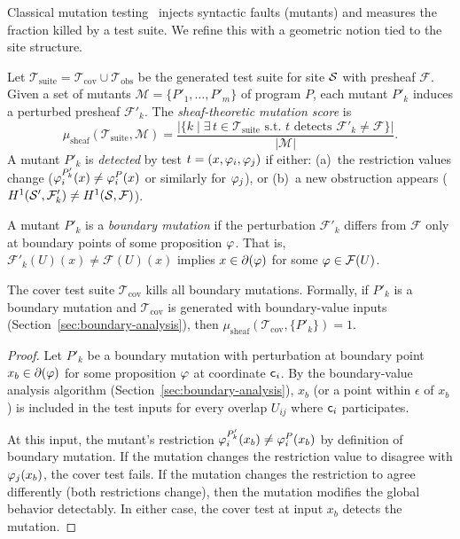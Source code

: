 \documentclass[11pt]{article}
\newcommand{\TestSuite}{\mathcal{T}_{\mathrm{suite}}}
\newcommand{\CoverSuite}{\mathcal{T}_{\mathrm{cov}}}
\newcommand{\ObstrSuite}{\mathcal{T}_{\mathrm{obs}}}
\begin{document}
Classical mutation testing~\cite{Jia2011} injects syntactic faults
(mutants) and measures the fraction killed by a test suite.  We refine
this with a geometric notion tied to the site structure.

\begin{definition}\label{def:sheaf-mutation}
Let $\TestSuite = \CoverSuite \cup \ObstrSuite$ be the generated test
suite for site $\mathcal{S}$ with presheaf $\mathcal{F}$.  Given a set of
mutants $\mathcal{M} = \{P'_1, \ldots, P'_m\}$ of program $P$, each
mutant $P'_k$ induces a perturbed presheaf $\mathcal{F}'_k$.  The
\emph{sheaf-theoretic mutation score} is
\[
  \mu_{\mathrm{sheaf}}(\TestSuite, \mathcal{M}) =
  \frac{|\{k \mid \exists\, t \in \TestSuite \text{ s.t.\ } t
  \text{ detects } \mathcal{F}'_k \neq \mathcal{F}\}|}{|\mathcal{M}|}.
\]
A mutant $P'_k$ is \emph{detected} by test $t = (x, \varphi_i, \varphi_j)$
if either: (a)~the restriction values change
($\varphi_i^{P'_k}(x) \neq \varphi_i^P(x)$ or similarly for $\varphi_j$),
or (b)~a new obstruction appears
($H^{1}(\mathcal{S}', \mathcal{F}'_k) \neq H^{1}(\mathcal{S}, \mathcal{F})$).
\end{definition}

\begin{definition}\label{def:boundary-mutation}
A mutant $P'_k$ is a \emph{boundary mutation} if the perturbation
$\mathcal{F}'_k$ differs from $\mathcal{F}$ only at boundary points
of some proposition $\varphi$.  That is, $\mathcal{F}'_k(U)(x) \neq
\mathcal{F}(U)(x)$ implies $x \in \partial(\varphi)$ for some
$\varphi \in \mathcal{F}(U)$.
\end{definition}

\begin{theorem}\label{thm:mutation-complete}
The cover test suite $\CoverSuite$ kills all boundary mutations.
Formally, if $P'_k$ is a boundary mutation and $\CoverSuite$ is
generated with boundary-value inputs (Section~\ref{sec:boundary-analysis}),
then $\mu_{\mathrm{sheaf}}(\CoverSuite, \{P'_k\}) = 1$.
\end{theorem}

\begin{proof}
Let $P'_k$ be a boundary mutation with perturbation at boundary point
$x_b \in \partial(\varphi)$ for some proposition $\varphi$ at coordinate
$\mathsf{c}_i$.  By the boundary-value analysis algorithm
(Section~\ref{sec:boundary-analysis}), $x_b$ (or a point within
$\epsilon$ of $x_b$) is included in the test inputs for every overlap
$U_{ij}$ where $\mathsf{c}_i$ participates.

At this input, the mutant's restriction $\varphi_i^{P'_k}(x_b) \neq
\varphi_i^P(x_b)$ by definition of boundary mutation.  If the mutation
changes the restriction value to disagree with $\varphi_j(x_b)$, the
cover test fails.  If the mutation changes the restriction to agree
differently (both restrictions change), then the mutation modifies
the global behavior detectably.  In either case, the cover test at
input $x_b$ detects the mutation.
\end{proof}
\end{document}
